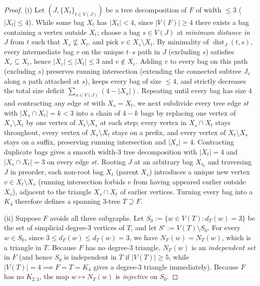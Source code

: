 \documentclass[11pt,reqno]{amsart}
\theoremstyle{plain}
\theoremstyle{definition}
\theoremstyle{remark}
\DeclareRobustCommand{\_}{\ifmmode\text{\textunderscore}\else\textunderscore\allowbreak\fi}
\begin{document}
\begin{proof}
(i) Let $(J, \{X_t\}_{t \in V(J)})$ be a tree decomposition of $F$ of width $\le 3$ ($|X_t| \le 4$). While some bag $X_t$ has $|X_t| < 4$, since $|V(F)| \ge 4$ there exists a bag containing a vertex outside $X_t$; choose a bag $s \in V(J)$ at \emph{minimum distance in $J$} from $t$ such that $X_s \not\subseteq X_t$, and pick $v \in X_s \setminus X_t$. By minimality of $\operatorname{dist}_J(t, s)$, every intermediate bag $r$ on the unique $t$--$s$ path in $J$ (excluding $s$) satisfies $X_r \subseteq X_t$, hence $|X_r| \le |X_t| \le 3$ and $v \notin X_r$. Adding $v$ to every bag on this path (excluding $s$) preserves running intersection (extending the connected subtree $J_v$ along a path attached at $s$), keeps every bag of size $\le 4$, and strictly decreases the total size deficit $\sum_{u \in V(J)} (4 - |X_u|)$. Repeating until every bag has size $4$ and contracting any edge $st$ with $X_s = X_t$, we next subdivide every tree edge $st$ with $|X_s \cap X_t| = k < 3$ into a chain of $4 - k$ bags by replacing one vertex of $X_s \setminus X_t$ by one vertex of $X_t \setminus X_s$ at each step; every vertex in $X_s \cap X_t$ stays throughout, every vertex of $X_s \setminus X_t$ stays on a prefix, and every vertex of $X_t \setminus X_s$ stays on a suffix, preserving running intersection and $|X_r| = 4$. Contracting duplicate bags gives a smooth width-$3$ tree decomposition with $|X_t| = 4$ and $|X_s \cap X_t| = 3$ on every edge $st$. Rooting $J$ at an arbitrary bag $X_{t_0}$ and traversing $J$ in preorder, each non-root bag $X_t$ (parent $X_s$) introduces a unique new vertex $v \in X_t \setminus X_s$ (running intersection forbids $v$ from having appeared earlier outside $X_s$), adjacent to the triangle $X_s \cap X_t$ of earlier vertices. Turning every bag into a $K_4$ therefore defines a spanning $3$-tree $T \supseteq F$.

(ii) Suppose $F$ avoids all three subgraphs. Let $S_0 := \{w \in V(T) : d_T(w) = 3\}$ be the set of simplicial degree-$3$ vertices of $T$, and let $S' := V(T) \setminus S_0$. For every $w \in S_0$, since $3 \le d_F(w) \le d_T(w) = 3$, we have $N_F(w) = N_T(w)$, which is a triangle in $T$. Because $F$ has no degree-$3$ triangle, $N_F(w)$ is an \emph{independent set} in $F$ (and hence $S_0$ is independent in $T$ if $|V(T)| \ge 5$, while $|V(T)| = 4 \implies F = T = K_4$ gives a degree-$3$ triangle immediately). Because $F$ has no $K_{2,3}$, the map $w \mapsto N_T(w)$ is \emph{injective} on $S_0$.


\end{proof}
\end{document}
